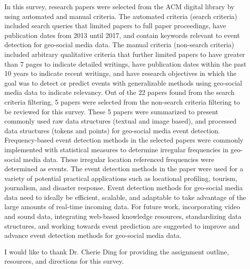 In this survey, research papers were selected from the ACM digital library by using automated and manual criteria. The automated criteria (search criteria) included search queries that limited papers to full paper proceedings, have publication dates from 2013 until 2017, and contain keywords relevant to event detection for geo-social media data. The manual criteria (non-search criteria) included arbitrary qualitative criteria that further limited papers to have greater than 7 pages to indicate detailed writings, have publication dates within the past 10 years to indicate recent writings, and have research objectives in which the goal was to detect or predict events with generalizable methods using geo-social media data to indicate relevancy. Out of the 22 papers found from the search criteria filtering, 5 papers were selected from the non-search criteria filtering to be reviewed for this survey. These 5 papers were summarized to present commonly used raw data structures (textual and image based), and processed data structures (tokens and points) for geo-social media event detection. Frequency-based event detection methods in the selected papers were commonly implemented with statistical measures to determine irregular frequencies in geo-social media data. These irregular location referenced frequencies were determined as events. The event detection methods in the paper were used for a variety of potential practical applications such as locational profiling, tourism, journalism, and disaster response. Event detection methods for geo-social media data need to ideally be efficient, scalable, and adaptable to take advantage of the large amounts of real-time incoming data. For future work, incorporating video and sound data, integrating web-based knowledge resources, standardizing data structures, and working towards event prediction are suggested to improve and advance event detection methods for geo-social media data.

\begin{acks}
I would like to thank Dr. Cherie Ding for providing the assignment outline, resources, and directions for this survey.
\end{acks}



